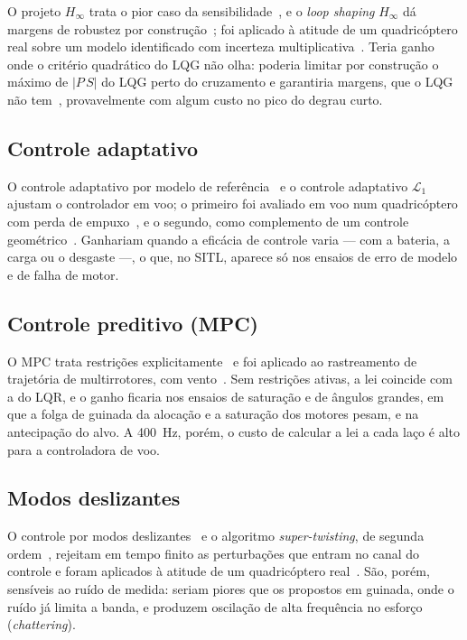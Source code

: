 O projeto
$H_\infty$ trata o pior caso da sensibilidade~\cite{zames1981}, e o
\textit{loop shaping} $H_\infty$ dá margens de robustez por
construção~\cite{mcfarlane1992}; foi aplicado à atitude de um quadricóptero
real sobre um modelo identificado com incerteza
multiplicativa~\cite{noormohammadiasl2020}. Teria ganho onde o critério
quadrático do LQG não olha: poderia limitar por construção o máximo de
$|P\,S|$ do LQG perto do cruzamento e garantiria margens, que o LQG não
tem~\cite{doyle1978}, provavelmente com algum custo no pico do degrau
curto.

\subsection{Controle adaptativo}

O controle adaptativo por modelo de
referência~\cite{astrom1995} e o controle adaptativo
$\mathcal{L}_1$~\cite{hovakimyan2010} ajustam o controlador em voo; o
primeiro foi avaliado em voo num quadricóptero com perda de
empuxo~\cite{dydek2013}, e o segundo, como complemento de um controle
geométrico~\cite{wu2022}. Ganhariam quando a eficácia de controle varia ---
com a bateria, a carga ou o desgaste ---, o que, no SITL, aparece só nos
ensaios de erro de modelo e de falha de motor.

\subsection{Controle preditivo (MPC)}

O MPC trata restrições
explicitamente~\cite{mayne2000} e foi aplicado ao rastreamento de trajetória
de multirrotores, com vento~\cite{kamel2017}. Sem restrições ativas, a lei
coincide com a do LQR, e o ganho ficaria nos ensaios de saturação e de
ângulos grandes, em que a folga de guinada da alocação e a saturação dos
motores pesam, e na antecipação do alvo. A \SI{400}{\hertz}, porém, o custo
de calcular a lei a cada laço é alto para a controladora de voo.

\subsection{Modos deslizantes}

O controle por modos
deslizantes~\cite{utkin1977} e o algoritmo \textit{super-twisting}, de
segunda ordem~\cite{levant1993}, rejeitam em tempo finito as perturbações
que entram no canal do controle e foram aplicados à atitude de um
quadricóptero real~\cite{derafa2012}. São, porém, sensíveis ao ruído de
medida: seriam piores que os propostos em guinada, onde o ruído já limita a
banda, e produzem oscilação de alta frequência no esforço
(\textit{chattering}).

